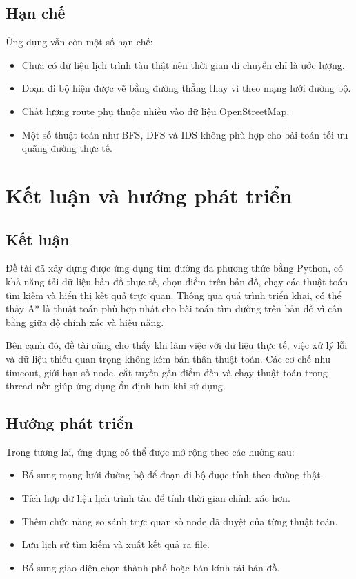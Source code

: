\documentclass[12pt,a4paper]{article}
\begin{document}
\subsection{Hạn chế}

Ứng dụng vẫn còn một số hạn chế:

\begin{itemize}
    \item Chưa có dữ liệu lịch trình tàu thật nên thời gian di chuyển chỉ là ước lượng.
    \item Đoạn đi bộ hiện được vẽ bằng đường thẳng thay vì theo mạng lưới đường bộ.
    \item Chất lượng route phụ thuộc nhiều vào dữ liệu OpenStreetMap.
    \item Một số thuật toán như BFS, DFS và IDS không phù hợp cho bài toán tối ưu quãng đường thực tế.
\end{itemize}

\section{Kết luận và hướng phát triển}

\subsection{Kết luận}

Đề tài đã xây dựng được ứng dụng tìm đường đa phương thức bằng Python, có khả năng tải dữ liệu bản đồ thực tế, chọn điểm trên bản đồ, chạy các thuật toán tìm kiếm và hiển thị kết quả trực quan. Thông qua quá trình triển khai, có thể thấy A* là thuật toán phù hợp nhất cho bài toán tìm đường trên bản đồ vì cân bằng giữa độ chính xác và hiệu năng.

Bên cạnh đó, đề tài cũng cho thấy khi làm việc với dữ liệu thực tế, việc xử lý lỗi và dữ liệu thiếu quan trọng không kém bản thân thuật toán. Các cơ chế như timeout, giới hạn số node, cắt tuyến gần điểm đến và chạy thuật toán trong thread nền giúp ứng dụng ổn định hơn khi sử dụng.

\subsection{Hướng phát triển}

Trong tương lai, ứng dụng có thể được mở rộng theo các hướng sau:

\begin{itemize}
    \item Bổ sung mạng lưới đường bộ để đoạn đi bộ được tính theo đường thật.
    \item Tích hợp dữ liệu lịch trình tàu để tính thời gian chính xác hơn.
    \item Thêm chức năng so sánh trực quan số node đã duyệt của từng thuật toán.
    \item Lưu lịch sử tìm kiếm và xuất kết quả ra file.
    \item Bổ sung giao diện chọn thành phố hoặc bán kính tải bản đồ.
\end{itemize}
\end{document}

